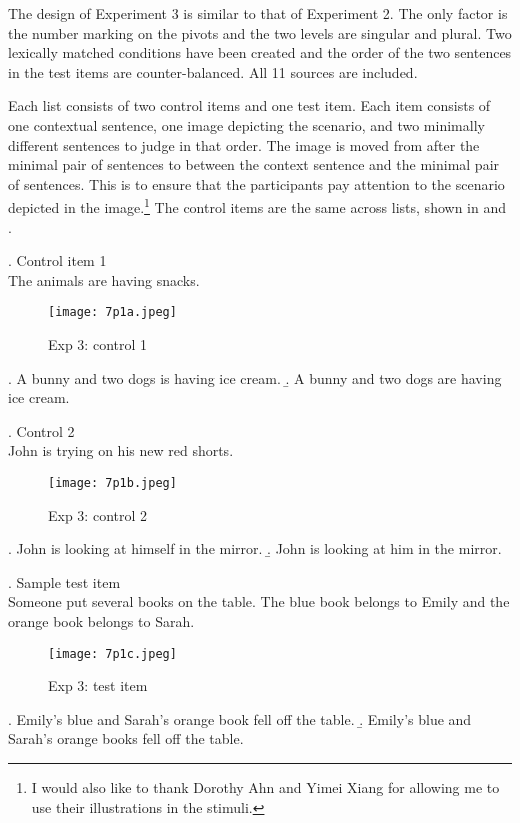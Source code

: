 \documentclass[
  11pt          %
  ,letterpaper  %
  ,center       %
  ,noupper      %
  ]{uconnthesis2}
\begin{document}
The design of Experiment 3 is similar to that of Experiment 2. The only factor is the number marking on the pivots and the two levels are singular and plural. Two lexically matched conditions have been created and the order of the two sentences in the test items are counter-balanced. All 11 sources are included. 

Each list consists of two control items and one test item. Each item consists of one contextual sentence, one image depicting the scenario, and two minimally different sentences to judge in that order. The image is moved from after the minimal pair of sentences to between the context sentence and the minimal pair of sentences. This is to ensure that the participants pay attention to the scenario depicted in the image.\footnote{I would also like to thank Dorothy Ahn and Yimei Xiang for allowing me to use their illustrations in the stimuli.} The control items are the same across lists, shown in \Next and \NNext.

\ex. Control item 1\\
The animals are having snacks.\\
\vspace{-0.5em}
\begin{figure}[htb!] 
\texttt{[image: 7p1a.jpeg]} \centering
\caption{Exp 3: control 1}
\label{fig:exp3a}
\end{figure}\vspace{-0.5em}
\a. A bunny and two dogs is having ice cream.
\b. A bunny and two dogs are having ice cream.

\ex. Control 2 \\
John is trying on his new red shorts.
\begin{figure}[htb!] 
\texttt{[image: 7p1b.jpeg]} \centering
\caption{Exp 3: control 2}
\label{fig:exp3b}
\end{figure}\vspace{-0.5em}
\a. John is looking at himself in the mirror.	
\b. John is looking at him in the mirror.

\ex.\label{7p1c} Sample test item\\
Someone put several books on the table. The blue book belongs to Emily and the orange book belongs to Sarah.
\vspace{-0.5em}
\begin{figure}[htb!]
\texttt{[image: 7p1c.jpeg]} \centering
\caption{Exp 3: test item}
\label{fig:exp3c}
\end{figure}
\vspace{-1em}
\a. Emily's blue and Sarah's orange book fell off the table.
\b. Emily's blue and Sarah's orange books fell off the table.
\end{document}
